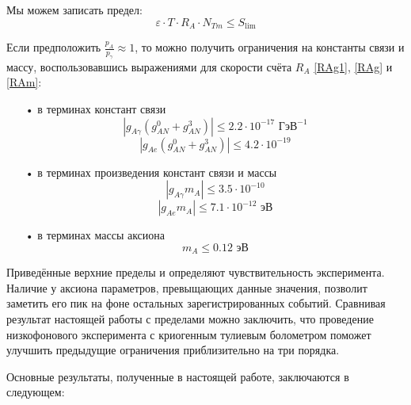 \documentclass[a4paper,article,14pt]{extarticle}
\begin{document}
Мы можем записать предел:
\begin{equation}
    \varepsilon  \cdot T \cdot {R_A} \cdot N_{Tm} \leqslant {S_{\lim }}
\end{equation}

Если предположить $\frac{{{p_A}}}{{{p_\gamma}}} \approx 1$, то можно получить ограничения на константы связи и массу, воспользовавшись выражениями для скорости счёта ${R_A}$ \eqref{RAg1}, \eqref{RAg} и \eqref{RAm}:

\begin{enumerate}
    \item[•] в терминах констант связи
          \begin{equation}
              \left| g_{A\gamma}{\left( {g_{AN}^0 + g_{AN}^3} \right)} \right| \leqslant 2.2 \cdot 10^{-17} \text{ ГэВ}^{-1}
          \end{equation}
          \begin{equation}
              \left| g_{Ae}{\left( {g_{AN}^0 + g_{AN}^3} \right)} \right| \leqslant 4.2 \cdot 10^{-19}
          \end{equation}
    \item[•] в терминах произведения констант связи и массы
          \begin{equation}
              \left| {{g_{A\gamma}}{m_A}} \right| \leqslant 3.5 \cdot 10^{-10}
          \end{equation}
          \begin{equation}
              \left| {{g_{Ae}}{m_A}} \right| \leqslant 7.1 \cdot 10^{-12} \text{ эВ}
          \end{equation}
    \item[•] в терминах массы аксиона
          \begin{equation}
              m_A \leqslant 0.12 \text{ эВ}
          \end{equation}
\end{enumerate}

Приведённые верхние пределы и определяют чувствительность эксперимента. Наличие у аксиона параметров, превыщающих данные значения, позволит заметить его пик на фоне остальных зарегистрированных событий. Сравнивая результат настоящей работы с пределами \cite{newlimits_tm} можно заключить, что проведение низкофонового эксперимента с криогенным тулиевым болометром поможет улучшить предыдущие ограничения приблизительно на три порядка.

Основные результаты, полученные в настоящей работе, заключаются в следующем:
\end{document}
